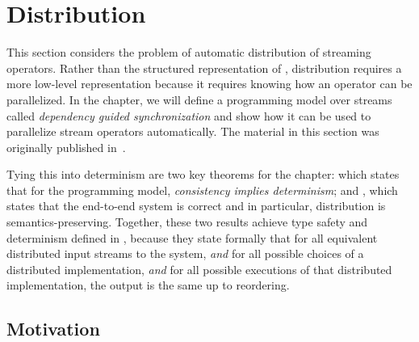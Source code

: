 \chapter{Distribution}
\label{cha:distribution}

This section considers the problem of automatic distribution of streaming operators.
Rather than the structured representation of ,
distribution requires a more low-level representation because it requires knowing how an operator can be parallelized.
In the chapter, we will define a programming model over streams called \emph{dependency guided synchronization} and show how it can be used to parallelize stream operators automatically.
The material in this section was originally published in~.

Tying this into determinism are two key theorems for the chapter:  which states that for the programming model, \emph{consistency implies determinism}; and , which states that the end-to-end system is correct and in particular, distribution is semantics-preserving.
Together, these two results achieve type safety and determinism defined in ,
because they state formally that for all equivalent distributed input streams to the system, \emph{and} for all possible choices of a distributed implementation, \emph{and} for all possible executions of that distributed implementation, the output is the same up to reordering.

\section{Motivation}

